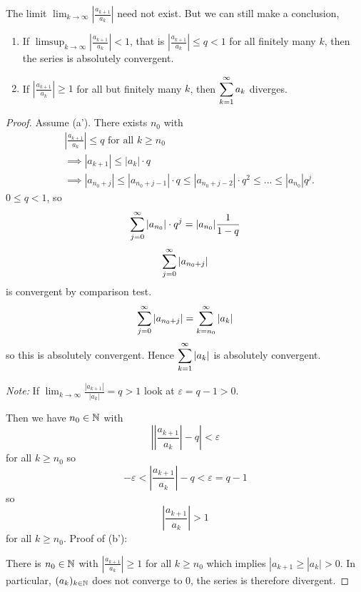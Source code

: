 \documentclass[10pt, a4paper]{article}
\newcommand{\dseq}[2][n]{(#2_#1)_{#1 \in \N}}
\begin{document}
\begin{remark}
    The limit $\displaystyle\lim_{k \rightarrow \infty}\left|\frac{a_{k + 1}}{a_k}\right|$ need not exist.
    But we can still make a conclusion,
    \begin{enumerate}[label = (\alph*')]
        \item If $\displaystyle\limsup_{k \rightarrow \infty}\left|\frac{a_{k + 1}}{a_k}\right| < 1$,
        that is $\left|\frac{a_{k + 1}}{a_k}\right| \leq q < 1$ for all finitely many $k$,
        then the series is absolutely convergent.
        \item If $\left|\frac{a_{k + 1}}{a_k}\right| \geq 1$ for all but finitely many $k$,
        then $\displaystyle\infsum[k = 1]a_k$ diverges.
    \end{enumerate}
    \begin{proof}
        Assume (a').
        There exists $n_0$ with
        \begin{align*}
            &\left|\frac{a_{k + 1}}{a_k}\right| \leq q\text{ for all } k \geq n_0 \\
            &\implies |a_{k + 1}| \leq |a_k|\cdot q \\
            &\implies |a_{n_0 + j}| \leq |a_{n_0 + j - 1}| \cdot q \leq |a_{n_0 + j - 2}|\cdot q ^ 2 \leq \dotsc \leq |a_{n_0}|q ^ {j}.
        \end{align*}
        $0 \leq q < 1$,
        so
        \[
        \infsum[j = 0]|a_{n_0}| \cdot q ^ j = |a_{n_0}|\frac{1}{1 - q}
        \]
        \[
        \infsum[j = 0]|a_{n_0 + j}|
        \]
        is convergent by comparison test.
        \[
        \infsum[j = 0]|a_{n_0 + j}| = \infsum[k = n_0]|a_k|
        \]
        so this is absolutely convergent.
        Hence $\displaystyle\infsum[k = 1]|a_k|$ is absolutely convergent.
        
        \textit{Note:}
        If $\lim_{k \rightarrow \infty}\frac{|a_{k + 1}|}{|a_k|} = q > 1$
        look at $\varepsilon = q - 1 > 0$.
        
        Then we have $n_0 \in \N$ with
        \[
        \left|\left|\frac{a_{k + 1}}{a_k}\right| - q\right| < \varepsilon
        \]
        for all $k \geq n_0$
        so
        \[
        -\varepsilon < \left|\frac{a_{k + 1}}{a_k}\right| - q < \varepsilon = q - 1
        \]
        so
        \[
        \left|\frac{a_{k + 1}}{a_k}\right| > 1
        \]
        for all $k \geq n_0$.
        Proof of (b'):
        
        There is $n_0 \in \N$ with $\left|\frac{a_{k + 1}}{a_k}\right| \geq 1$ for all $k \geq n_0$
        which implies $|a_{k + 1} \geq |a_k| > 0$.
        In particular,
        $\dseq[k]{a}$ does not converge to $0$,
        the series is therefore divergent.
    \end{proof}
\end{remark}
\end{document}
